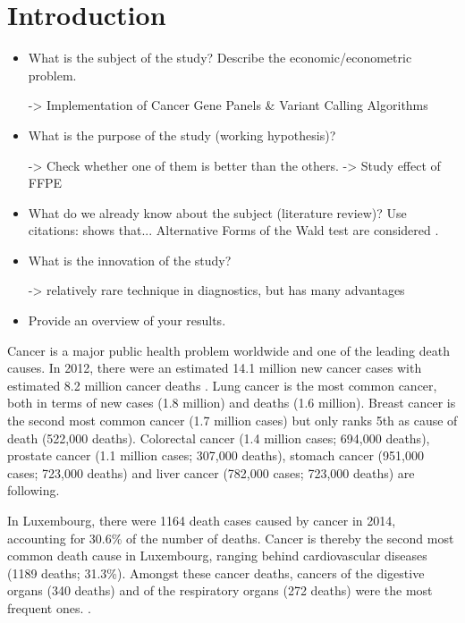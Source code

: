 \section{Introduction}

\begin{itemize}

\item What is the subject of the study? Describe the
economic/econometric problem.

-> Implementation of Cancer Gene Panels & Variant Calling Algorithms

\item What is the purpose of the study (working hypothesis)?

-> Check whether one of them is better than the others.
-> Study effect of FFPE

\item What do we already know about the subject (literature
review)? Use citations: { \cite{mutect:2013} shows that...
Alternative Forms of the Wald test are considered
\citep{Breusch&Schmidt:88}.}

\item What is the innovation of the study?

-> relatively rare technique in diagnostics, but has many advantages

\item Provide an overview of your results.


\end{itemize}

Cancer is a major public health problem worldwide and one of the leading death
causes. In 2012, there were an estimated 14.1 million new cancer cases with
estimated  8.2 million cancer deaths {\cite{cancer_stats_worldwide:2012}}. Lung
cancer is the most common cancer, both in terms of new cases (1.8 million) and
deaths (1.6 million). Breast  cancer is the second most common cancer (1.7
million cases) but only ranks 5th as cause of death (522,000 deaths). Colorectal
cancer (1.4 million cases; 694,000 deaths), prostate cancer (1.1 million cases;
307,000 deaths), stomach cancer (951,000 cases; 723,000 deaths) and liver cancer
(782,000 cases; 723,000 deaths) are following.

In Luxembourg, there were 1164 death cases caused by cancer in 2014, accounting
for 30.6\%  of the number of deaths. Cancer is thereby the second most common
death cause in Luxembourg, ranging behind cardiovascular diseases (1189 deaths;
31.3\%). Amongst these cancer deaths, cancers of the digestive organs (340
deaths) and of the respiratory organs (272 deaths) were the most frequent ones.
{\cite{cancer_stats:2012}}.

